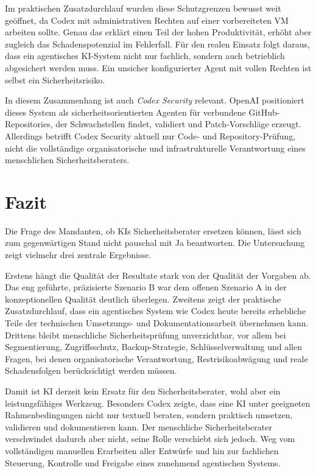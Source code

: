 Im praktischen Zusatzdurchlauf wurden diese Schutzgrenzen bewusst weit geöffnet, da Codex mit administrativen Rechten auf einer vorbereiteten \acl{VM} arbeiten sollte. Genau das erklärt einen Teil der hohen Produktivität, erhöht aber zugleich das Schadenspotenzial im Fehlerfall. Für den realen Einsatz folgt daraus, dass ein agentisches \ac{KI}-System nicht nur fachlich, sondern auch betrieblich abgesichert werden muss. Ein unsicher konfigurierter Agent mit vollen Rechten ist selbst ein Sicherheitsrisiko.

In diesem Zusammenhang ist auch \emph{Codex Security} relevant. OpenAI positioniert dieses System als sicherheitsorientierten Agenten für verbundene GitHub-Repositories, der Schwachstellen findet, validiert und Patch-Vorschläge erzeugt.\cite{openai2026codexsecurity,openai2026codexsecuritypreview} Allerdings betrifft Codex Security aktuell nur Code- und Repository-Prüfung, nicht die vollständige organisatorische und infrastrukturelle Verantwortung eines menschlichen Sicherheitsberaters.

\section{Fazit}

Die Frage des Mandanten, ob \acs{KI}s Sicherheitsberater ersetzen können, lässt sich zum gegenwärtigen Stand nicht pauschal mit Ja beantworten. Die Untersuchung zeigt vielmehr drei zentrale Ergebnisse.

Erstens hängt die Qualität der Resultate stark von der Qualität der Vorgaben ab. Das eng geführte, präzisierte Szenario B war dem offenen Szenario A in der konzeptionellen Qualität deutlich überlegen. Zweitens zeigt der praktische Zusatzdurchlauf, dass ein agentisches System wie Codex heute bereits erhebliche Teile der technischen Umsetzungs- und Dokumentationsarbeit übernehmen kann. Drittens bleibt menschliche Sicherheitsprüfung unverzichtbar, vor allem bei Segmentierung, Zugriffsschutz, Backup-Strategie, Schlüsselverwaltung und allen Fragen, bei denen organisatorische Verantwortung, Restrisikoabwägung und reale Schadensfolgen berücksichtigt werden müssen.

Damit ist \ac{KI} derzeit kein Ersatz für den Sicherheitsberater, wohl aber ein leistungsfähiges Werkzeug. Besonders Codex zeigte, dass eine \acs{KI} unter geeigneten Rahmenbedingungen nicht nur textuell beraten, sondern praktisch umsetzen, validieren und dokumentieren kann. Der menschliche Sicherheitsberater verschwindet dadurch aber nicht, seine Rolle verschiebt sich jedoch. Weg vom vollständigen manuellen Erarbeiten aller Entwürfe und hin zur fachlichen Steuerung, Kontrolle und Freigabe eines zunehmend agentischen Systems.
